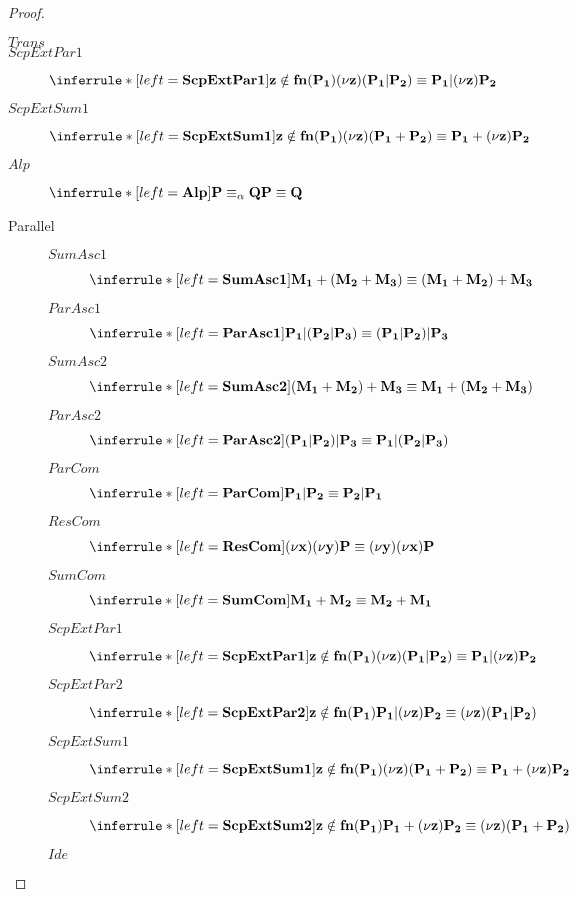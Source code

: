 \begin{proposition}
\begin{proof}
\begin{description}
\begin{description}
	      \item[$Trans$]
	      \item[$ScpExtPar1$]
		$\inferrule* [left=\bf{ScpExtPar1}]{z\notin fn(P_{1})}{(\nu z) (P_{1}|P_{2}) \equiv P_{1}|(\nu z) P_{2}}$
	      \item[$ScpExtSum1$]
		$\inferrule* [left=\bf{ScpExtSum1}]{z\notin fn(P_{1})}{(\nu z) (P_{1}+P_{2}) \equiv P_{1}+(\nu z) P_{2}}$
	      \item[$Alp$]
		$\inferrule* [left=\bf{Alp}] {
		  P \equiv_{\alpha} Q
		}{
		  P\equiv Q
		}$
	    \end{description}
	\end{description}
    \begin{description}
      \item[Parallel]
	    \begin{description}
	      \item[$SumAsc1$]
		$\inferrule* [left=\bf{SumAsc1}]{}{M_{1}+(M_{2}+M_{3})\equiv (M_{1}+M_{2})+M_{3}}$ 
	      \item[$ParAsc1$]
		$\inferrule* [left=\bf{ParAsc1}]{}{P_{1}|(P_{2}|P_{3})\equiv (P_{1}|P_{2})|P_{3}}$
	      \item[$SumAsc2$]
		$\inferrule* [left=\bf{SumAsc2}]{}{(M_{1}+M_{2})+M_{3}\equiv M_{1}+(M_{2}+M_{3})}$
	      \item[$ParAsc2$]
		$\inferrule* [left=\bf{ParAsc2}]{}{(P_{1}|P_{2})|P_{3}\equiv P_{1}|(P_{2}|P_{3})}$ 
	      \item[$ParCom$]
		$\inferrule* [left=\bf{ParCom}]{}{P_{1}|P_{2}\equiv P_{2}|P_{1}}$ 
	      \item[$ResCom$]
	      	$\inferrule* [left=\bf{ResCom}]{}{(\nu x) (\nu y) P \equiv (\nu y) (\nu x) P}$
      	      \item[$SumCom$]
		$\inferrule* [left=\bf{SumCom}]{}{M_{1}+M_{2}\equiv M_{2}+M_{1}}$
	      \item[$ScpExtPar1$]
		$\inferrule* [left=\bf{ScpExtPar1}]{z\notin fn(P_{1})}{(\nu z) (P_{1}|P_{2}) \equiv P_{1}|(\nu z) P_{2}}$
	      \item[$ScpExtPar2$]
		$\inferrule* [left=\bf{ScpExtPar2}]{z\notin fn(P_{1})}{P_{1}|(\nu z) P_{2} \equiv (\nu z) (P_{1}|P_{2})}$ 
	      \item[$ScpExtSum1$]
		$\inferrule* [left=\bf{ScpExtSum1}]{z\notin fn(P_{1})}{(\nu z) (P_{1}+P_{2}) \equiv P_{1}+(\nu z) P_{2}}$
	      \item[$ScpExtSum2$]
		$\inferrule* [left=\bf{ScpExtSum2}]{z\notin fn(P_{1})}{P_{1}+(\nu z) P_{2} \equiv (\nu z) (P_{1}+P_{2})}$ 
	      \item[$Ide$]

\end{description}
\end{description}
\end{proof}
\end{proposition}
